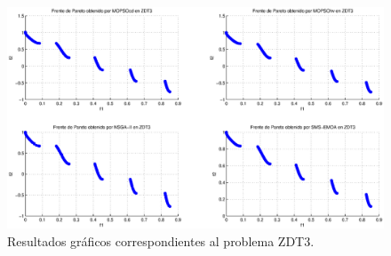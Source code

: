 \DIFaddend \clearpage
\newpage
\begin{figure}
      \begin{center}
	  \includegraphics[scale=0.45]{Cap4/rzdt3r.eps}
      \end{center}
	\caption{Resultados gr\'aficos correspondientes al problema ZDT3.}
      \label{fig:rZDT3}
      \end{figure}
\clearpage
\newpage
